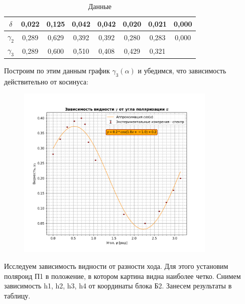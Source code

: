 \documentclass[a4paper, 12pt]{article}
\begin{document}
\begin{table}[H]
\begin{tabular}{|c|c|c|c|c|c|c|c|}
	$\delta$          & 0,022        & 0,125       & 0,042        & 0,042        & 0,020        & 0,021        & 0,000        \\ \hline
	$\gamma_2$        & 0,289        & 0,629       & 0,392        & 0,392        & 0,280        & 0,283        & 0,000        \\ \hline
	$\gamma_3$        & 0,289        & 0,600       & 0,510        & 0,408        & 0,429        & 0,321        &              \\ \hline
	\end{tabular}
	\caption{Данные}
	\label{tab:data}
\end{table}
Построим по этим данным график $\gamma_3(\alpha)$ и убедимся, что зависимость действительно от косинуса:

\begin{figure}[H]
    \centering
    \includegraphics[width=0.85\textwidth]{plot4--5--2-3.png}
    \label{fig:plot1}
\end{figure}
Исследуем зависимость видности от разности хода. Для этого установим поляроид П1 в положение, в котором картина видна наиболее четко. Снимем зависимость h1, h2, h3, h4 от координаты блока Б2.
Занесем результаты в таблицу.
\end{document}

